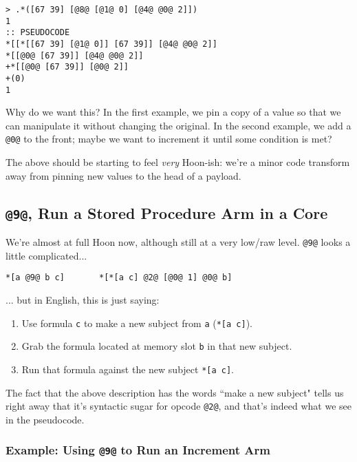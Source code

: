 \documentclass[twoside]{article}
\begin{document}
\begin{lstlisting}[style=listingcode]
> .*([67 39] [@8@ [@1@ 0] [@4@ @0@ 2]])
1
:: PSEUDOCODE
*[[*[[67 39] [@1@ 0]] [67 39]] [@4@ @0@ 2]]
*[[@0@ [67 39]] [@4@ @0@ 2]]
+*[[@0@ [67 39]] [@0@ 2]]
+(0)
1
\end{lstlisting}

Why do we want this? In the first example, we pin a copy of a value so that we can manipulate it without changing the original. In the second example, we add a \lstinline[style=inlinecode]{@0@} to the front; maybe we want to increment it until some condition is met?

The above should be starting to feel \emph{very} Hoon-ish: we're a minor code transform away from pinning new values to the head of a payload.

\subsection{\lstinline[style=inlinecode]{@9@}, Run a Stored Procedure Arm in a Core}

We're almost at full Hoon now, although still at a very low/raw level. \lstinline[style=inlinecode]{@9@} looks a little complicated...

\begin{lstlisting}[style=listingcode]
*[a @9@ b c]       *[*[a c] @2@ [@0@ 1] @0@ b]
\end{lstlisting}

\noindent{}
... but in English, this is just saying:

\begin{enumerate}
  \item  Use formula \lstinline[style=inlinecode]{c} to make a new subject from \lstinline[style=inlinecode]{a} (\lstinline[style=inlinecode]{*[a c]}).
  \item  Grab the formula located at memory slot \lstinline[style=inlinecode]{b} in that new subject.
  \item  Run that formula against the new subject \lstinline[style=inlinecode]{*[a c]}.
\end{enumerate}

\noindent{}
The fact that the above description has the words ``make a new subject" tells us right away that it's syntactic sugar for opcode \lstinline[style=inlinecode]{@2@}, and that's indeed what we see in the pseudocode.

\subsubsection{Example: Using \lstinline[style=inlinecode]{@9@} to Run an Increment Arm}
\end{document}
